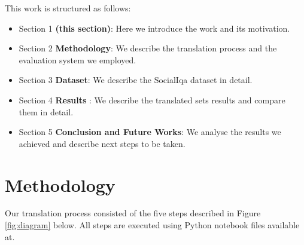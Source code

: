 \documentclass{article}
\begin{document}
This work is structured as follows:
\begin{itemize}
    \item Section 1 \textbf{(this section)}: Here we introduce the work and its
    motivation.
    \item Section 2 \textbf{Methodology}: We describe the translation process
    and the evaluation system we employed.
    \item Section 3 \textbf{Dataset}: We describe the SocialIqa dataset in
    detail.
    \item Section 4 \textbf{Results} : We describe the translated sets results
    and compare them in detail.
    \item Section 5 \textbf{Conclusion and Future Works}: We analyse the results
    we achieved and describe next steps to be taken.
\end{itemize}

\section{Methodology} 

Our translation process consisted of the five steps described in Figure
\ref{fig:diagram} below. All steps are executed using Python notebook files
available at.
\end{document}

